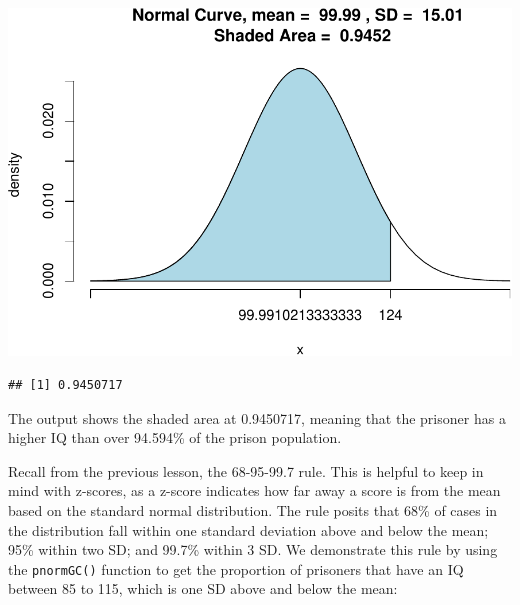 \documentclass[
]{book}
\newenvironment{Shaded}{\begin{snugshade}}{\end{snugshade}}
\newcommand{\AttributeTok}[1]{\textcolor[rgb]{0.77,0.63,0.00}{#1}}
\newcommand{\CommentTok}[1]{\textcolor[rgb]{0.56,0.35,0.01}{\textit{#1}}}
\newcommand{\ConstantTok}[1]{\textcolor[rgb]{0.00,0.00,0.00}{#1}}
\newcommand{\DecValTok}[1]{\textcolor[rgb]{0.00,0.00,0.81}{#1}}
\newcommand{\FunctionTok}[1]{\textcolor[rgb]{0.00,0.00,0.00}{#1}}
\newcommand{\NormalTok}[1]{#1}
\newcommand{\OtherTok}[1]{\textcolor[rgb]{0.56,0.35,0.01}{#1}}
\newcommand{\SpecialCharTok}[1]{\textcolor[rgb]{0.00,0.00,0.00}{#1}}
\newcommand{\StringTok}[1]{\textcolor[rgb]{0.31,0.60,0.02}{#1}}
\begin{document}
\begin{Shaded}
\end{Shaded}

\includegraphics{06-hypotheses_files/figure-latex/unnamed-chunk-24-1.pdf}

\begin{verbatim}
## [1] 0.9450717
\end{verbatim}

The output shows the shaded area at 0.9450717, meaning that the prisoner has a higher IQ than over 94.594\% of the prison population.

Recall from the previous lesson, the 68-95-99.7 rule. This is helpful to keep in mind with z-scores, as a z-score indicates how far away a score is from the mean based on the standard normal distribution. The rule posits that 68\% of cases in the distribution fall within one standard deviation above and below the mean; 95\% within two SD; and 99.7\% within 3 SD. We demonstrate this rule by using the \texttt{pnormGC()} function to get the proportion of prisoners that have an IQ between 85 to 115, which is one SD above and below the mean:
\end{document}

